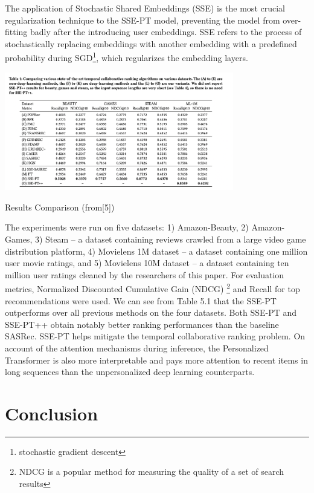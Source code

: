 The application of Stochastic Shared Embeddings (SSE) is the most crucial regularization technique to the SSE-PT model, preventing the model from over-fitting badly after the introducing user embeddings. SSE refers to the process of 
stochastically replacing embeddings with another embedding with
a predefined probability during SGD\footnote{stochastic gradient descent}, which regularizes the embedding layers. 
\begin{table}[ht!]
    \centering
    \includegraphics[width=100mm]{results_Transformer.png}
    \caption{Results Comparison (from[5])
    \label{overflow}}
\end{table}
The experiments were run on five datasets: 1) Amazon-Beauty, 2) Amazon-Games, 3) Steam -- a dataset containing reviews crawled from a large video game distribution platform, 4) Movielens 1M dataset -- a dataset containing one million user movie ratings, and 5) Movielens 10M dataset -- a dataset containing ten million user ratings cleaned by the researchers of this paper. For evaluation metrics, Normalized Discounted Cumulative Gain (NDCG) \footnote{NDCG is a popular method for measuring the quality of a set of search results} and Recall for top recommendations were used. We can see from Table 5.1 that the SSE-PT outperforms over all previous methods on the four datasets. Both SSE-PT and SSE-PT++ obtain notably better ranking performances than the baseline SASRec. SSE-PT helps mitigate the temporal collaborative ranking problem. On account of the attention mechanisms
during inference, the Personalized Transformer is also more interpretable and pays more attention to recent items in long sequences than the unpersonalized deep learning counterparts.

\chapter{Conclusion}

